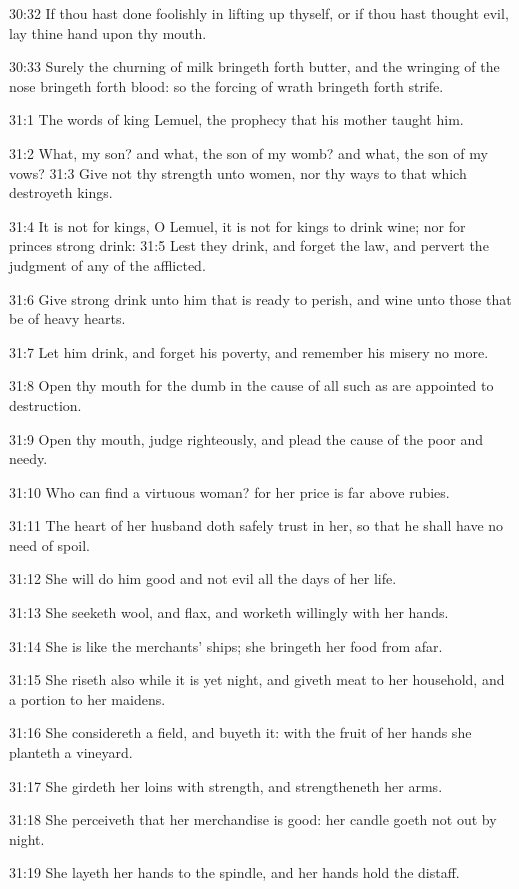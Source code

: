 30:32 If thou hast done foolishly in lifting up thyself, or if thou
hast thought evil, lay thine hand upon thy mouth.

30:33 Surely the churning of milk bringeth forth butter, and the
wringing of the nose bringeth forth blood: so the forcing of wrath
bringeth forth strife.

31:1 The words of king Lemuel, the prophecy that his mother taught
him.

31:2 What, my son? and what, the son of my womb? and what, the son of
my vows?  31:3 Give not thy strength unto women, nor thy ways to that
which destroyeth kings.

31:4 It is not for kings, O Lemuel, it is not for kings to drink wine;
nor for princes strong drink: 31:5 Lest they drink, and forget the
law, and pervert the judgment of any of the afflicted.

31:6 Give strong drink unto him that is ready to perish, and wine unto
those that be of heavy hearts.

31:7 Let him drink, and forget his poverty, and remember his misery no
more.

31:8 Open thy mouth for the dumb in the cause of all such as are
appointed to destruction.

31:9 Open thy mouth, judge righteously, and plead the cause of the
poor and needy.

31:10 Who can find a virtuous woman? for her price is far above
rubies.

31:11 The heart of her husband doth safely trust in her, so that he
shall have no need of spoil.

31:12 She will do him good and not evil all the days of her life.

31:13 She seeketh wool, and flax, and worketh willingly with her
hands.

31:14 She is like the merchants' ships; she bringeth her food from
afar.

31:15 She riseth also while it is yet night, and giveth meat to her
household, and a portion to her maidens.

31:16 She considereth a field, and buyeth it: with the fruit of her
hands she planteth a vineyard.

31:17 She girdeth her loins with strength, and strengtheneth her arms.

31:18 She perceiveth that her merchandise is good: her candle goeth
not out by night.

31:19 She layeth her hands to the spindle, and her hands hold the
distaff.

